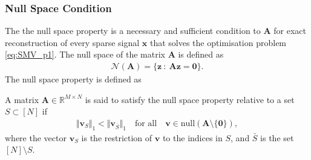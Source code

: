 \subsubsection{Null Space Condition}
The the null space property is a necessary and sufficient condition to $\mathbf{A}$ for exact reconstruction of every sparse signal $\mathbf{x}$ that solves the optimisation problem \eqref{eq:SMV_p1}\cite[p. 77]{FR}. 
The null space of the matrix $\mathbf{A}$ is defined as
\begin{align*}
\mathcal{N}(\mathbf{A}) = \{ \mathbf{z} \ : \ \mathbf{Az} = \textbf{0} \}.
\end{align*} 
The null space property is defined as
\begin{definition}
A matrix $\mathbf{A} \in \mathbb{R}^{M \times N}$ is said to satisfy the null space property relative to a set $S \subset [N]$ if
\begin{align}
\Vert \mathbf{v}_S \Vert_1 < \Vert \mathbf{v}_{\overline{S}} \Vert_1 \quad \text{for all} \quad \mathbf{v} \in \text{null}(\mathbf{A} \setminus \lbrace \mathbf{0} \rbrace),
\end{align}
where the vector $\mathbf{v}_S$ is the restriction of $\mathbf{v}$ to the indices in $S$, and $\bar{S}$ is the set $[N] \setminus S$. 
\end{definition}

